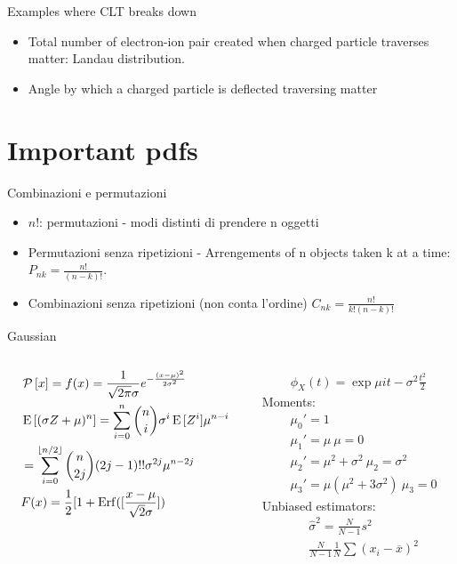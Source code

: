 \documentclass[asd-beamer.tex]{subfiles}
\begin{document}
\begin{frame}{Examples where CLT breaks down}
\begin{itemize}
\item Total number of electron-ion pair created when charged particle traverses matter: Landau distribution.
\item Angle by which a charged particle is deflected traversing matter
\end{itemize}
\end{frame}

\section{Important pdfs}

\begin{wordonframe}{Combinazioni e permutazioni}
\begin{itemize}
\item $n!$: permutazioni - modi distinti di prendere n oggetti
\item Permutazioni senza ripetizioni - Arrengements of n objects taken k at a time: $P_{nk}=\frac{n!}{(n-k)!}$.
\item Combinazioni senza ripetizioni (non conta l'ordine) $C_{nk}=\frac{n!}{k!(n-k)!}$
\end{itemize}
\end{wordonframe}

\begin{frame}{Gaussian}
\begin{columns}[T]
\begin{column}{0.5\textwidth}
\begin{align*}
&\operatorname{\mathcal{P}}{[x]}=f(x)=\frac{1}{\sqrt{2\pi}\sigma}e^{-\frac{(x-\mu)^2}{2\sigma^2}}\\
&\operatorname{E}{[(\sigma Z+\mu)^n]}=\sum_{i=0}^n\binom{n}{i}\sigma^i\operatorname{E}{[Z^i]}\mu^{n-i}\\
&=\sum_{i=0}^{\lfloor n/2\rfloor}\binom{n}{2j}(2j-1)!!\sigma^{2j}\mu^{n-2j}\\
&F(x)=\frac{1}{2}[1+\operatorname{Erf}([\frac{x-\mu}{\sqrt{2}\sigma}])
\end{align*}
\end{column}
\begin{column}{0.5\textwidth}
\begin{align*}
\phi_X(t)=\exp{\mu it-\sigma^2\frac{t^2}{2}}
\end{align*}
Moments:
\begin{align*}
&\mu_0'=1\\
&\mu_1'=\mu\ \mu=0\\
&\mu_2'=\mu^2+\sigma^2\ \mu_2=\sigma^2\\
&\mu_3'=\mu(\mu^2+3\sigma^2)\ \mu_3=0
\end{align*}
Unbiased estimators:
\begin{align*}
&\hat{\sigma}^2=\frac{N}{N-1}s^2\\
&\frac{N}{N-1}\frac{1}{N}\sum(x_i-\overline{x})^2
\end{align*}
\end{column}
\end{columns}
\end{frame}
\end{document}
